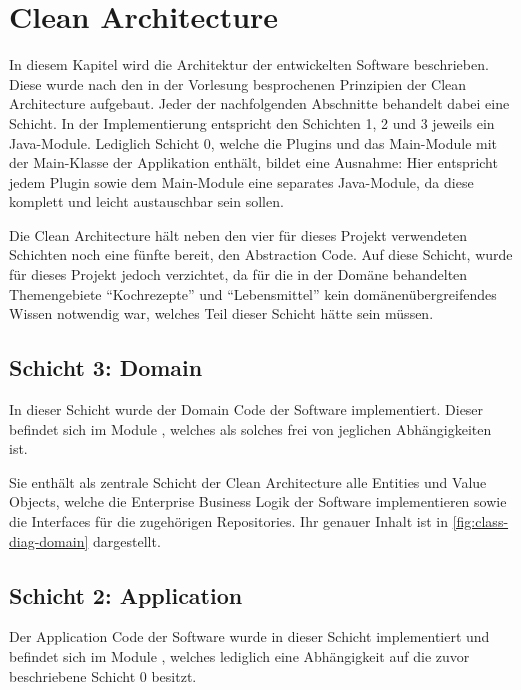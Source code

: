 \chapter{Clean Architecture}
In diesem Kapitel wird die Architektur der entwickelten Software beschrieben. Diese wurde nach den in der Vorlesung besprochenen Prinzipien der Clean Architecture aufgebaut. Jeder der nachfolgenden Abschnitte behandelt dabei eine Schicht. In der Implementierung entspricht den Schichten 1, 2 und 3 jeweils ein Java-Module. Lediglich Schicht 0, welche die Plugins und das Main-Module mit der Main-Klasse der Applikation enthält, bildet eine Ausnahme: Hier entspricht jedem Plugin sowie dem Main-Module eine separates Java-Module, da diese komplett und leicht austauschbar sein sollen.

Die Clean Architecture hält neben den vier für dieses Projekt verwendeten Schichten noch eine fünfte bereit, den Abstraction Code. Auf diese Schicht, wurde für dieses Projekt jedoch verzichtet, da für die in der Domäne behandelten Themengebiete \enquote{Kochrezepte} und \enquote{Lebensmittel} kein domänenübergreifendes Wissen notwendig war, welches Teil dieser Schicht hätte sein müssen. 

\section{Schicht 3: Domain}
In dieser Schicht wurde der Domain Code der Software implementiert. Dieser befindet sich im Module , welches als solches frei von jeglichen Abhängigkeiten ist.

Sie enthält als zentrale Schicht der Clean Architecture alle Entities und Value Objects, welche die Enterprise Business Logik der Software implementieren sowie die Interfaces für die zugehörigen Repositories. Ihr genauer Inhalt ist in \autoref{fig:class-diag-domain} dargestellt.

\section{Schicht 2: Application}
Der Application Code der Software wurde in dieser Schicht implementiert und befindet sich im Module , welches lediglich eine Abhängigkeit auf die zuvor beschriebene Schicht 0 besitzt.

